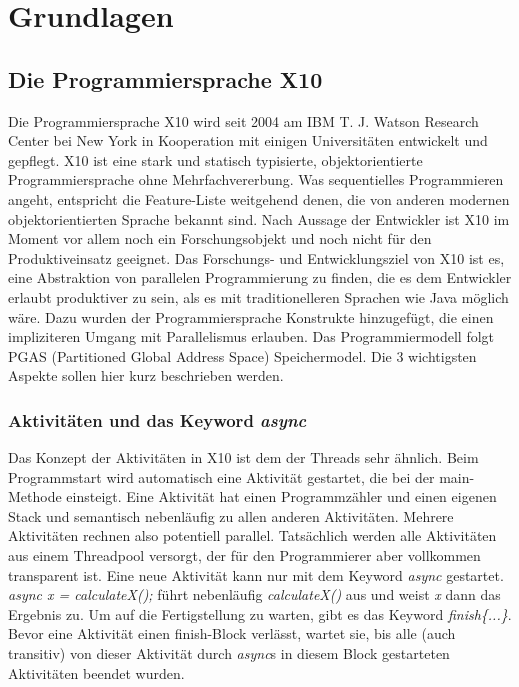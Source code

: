 \chapter{Grundlagen} %
\label{cha:grundlagen}

\section{Die Programmiersprache X10} %
\label{sec:die_programmiersprache_x10}
Die Programmiersprache X10 wird seit 2004 am IBM T. J. Watson Research Center bei New York in Kooperation mit einigen Universitäten entwickelt und gepflegt. X10 ist eine stark und statisch typisierte, objektorientierte Programmiersprache ohne Mehrfachvererbung. Was sequentielles Programmieren angeht, entspricht die Feature-Liste weitgehend denen, die von anderen modernen objektorientierten Sprache bekannt sind. Nach Aussage der Entwickler ist X10 im Moment vor allem noch ein Forschungsobjekt und noch nicht für den Produktiveinsatz geeignet. Das Forschungs- und Entwicklungsziel von X10 ist es, eine Abstraktion von parallelen Programmierung zu finden, die es dem Entwickler erlaubt produktiver zu sein, als es mit traditionelleren Sprachen wie Java möglich wäre. Dazu wurden der Programmiersprache Konstrukte hinzugefügt, die einen impliziteren Umgang mit Parallelismus erlauben. Das Programmiermodell folgt PGAS (Partitioned Global Address Space) Speichermodel. Die 3 wichtigsten Aspekte sollen hier kurz beschrieben werden.\cite{x10FAQ:2012:Online}

\subsection{Aktivitäten und das Keyword \textit{async}}  %
\label{sub:aktivitaeten_und_das_keyword_async}
Das Konzept der Aktivitäten in X10 ist dem der Threads sehr ähnlich. Beim Programmstart wird automatisch eine Aktivität gestartet, die bei der main-Methode einsteigt. Eine Aktivität hat einen Programmzähler und einen eigenen Stack und semantisch nebenläufig zu allen anderen Aktivitäten. Mehrere Aktivitäten rechnen also potentiell parallel. Tatsächlich werden alle Aktivitäten aus einem Threadpool versorgt, der für den Programmierer aber vollkommen transparent ist. Eine neue Aktivität kann nur mit dem Keyword \textit{async} gestartet. \textit{ async x = calculateX();} führt nebenläufig \textit{calculateX()} aus und weist \textit{x} dann das Ergebnis zu. Um auf die Fertigstellung zu warten, gibt es das Keyword \textit{finish\{...\}}. Bevor eine Aktivität einen finish-Block verlässt, wartet sie, bis alle (auch transitiv) von dieser Aktivität durch \textit{async}s in diesem Block gestarteten Aktivitäten beendet wurden.\cite{x10Spec:2012:Online}

